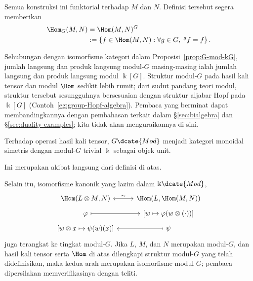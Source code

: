 Semua konstruksi ini funktorial terhadap $M$ dan $N$. Definisi tersebut segera
memberikan
\begin{align*}
	\Hom_G(M, N) & = \Hom(M, N)^G \\
	& := \left\{f \in \Hom(M, N): \forall g \in G, \; {}^g f = f \right\}.
\end{align*}

Sehubungan dengan isomorfisme kategori dalam
Proposisi~\ref{prop:G-mod-kG}, jumlah langsung dan produk langsung modul-$G$
masing-masing ialah jumlah langsung dan produk langsung modul $\Bbbk[G]$.
Struktur modul-$G$ pada hasil kali tensor dan modul $\Hom$ sedikit lebih rumit;
dari sudut pandang teori modul, struktur tersebut sesungguhnya bersesuaian
dengan struktur aljabar Hopf pada $\Bbbk[G]$
(Contoh~\ref{eg:group-Hopf-algebra}). Pembaca yang berminat dapat
membandingkannya dengan pembahasan terkait dalam \S\ref{sec:bialgebra} dan
\S\ref{sec:duality-examples}; kita tidak akan menguraikannya di sini.

\begin{proposisi}\label{prop:Gmod-monoidal}
	Terhadap operasi hasil kali tensor, $G\dcate{Mod}$ menjadi kategori monoidal
	simetris dengan modul-$G$ trivial $\Bbbk$ sebagai objek unit.
\end{proposisi}

\begin{bukti}
	Ini merupakan akibat langsung dari definisi di atas.
\end{bukti}

Selain itu, isomorfisme kanonik yang lazim dalam $\Bbbk\dcate{Mod}$,
\begin{equation*}
	\begin{tikzcd}[row sep=tiny]
		\Hom(L \otimes M, N) \arrow[leftrightarrow, r, "\sim"] & \Hom(L, \Hom(M, N)) \\
		\varphi \arrow[mapsto, r] & {\left[ w \mapsto \varphi(w \otimes (\cdot)) \right]} \\
		{\left[ w \otimes x \mapsto \psi(w)(x) \right]} & \psi \arrow[mapsto, l]
	\end{tikzcd}
\end{equation*}
juga terangkat ke tingkat modul-$G$. Jika $L$, $M$, dan $N$ merupakan
modul-$G$, dan hasil kali tensor serta $\Hom$ di atas dilengkapi struktur
modul-$G$ yang telah didefinisikan, maka kedua arah merupakan isomorfisme
modul-$G$; pembaca dipersilakan memverifikasinya dengan teliti.

